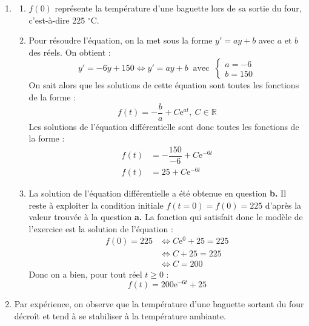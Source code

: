 \documentclass[10pt]{article}
\providecommand{\R}{\mathbb{R}}
\providecommand{\e}{{\mathrm{e}}}
\begin{document}
\begin{enumerate}
\item 
	\begin{enumerate}
		\item
$f(0)$ représente la température d'une baguette lors de sa sortie du four, c'est-à-dire 225 $^{\circ}$C.		
		\item 
Pour résoudre l'équation, on la met sous la forme $y'=ay+b$ avec $a$ et $b$ des réels. On obtient :
        \begin{equation*}
            y'=-6y+150 \iff y'=ay+b \ \text{ avec } \ \begin{cases}
            a=-6 \\ b=150
            \end{cases}
        \end{equation*}
        On sait alors que les solutions de cette équation sont toutes les fonctions de la forme : 
        \begin{equation*}
            f(t)= - \dfrac{b}{a}+C\e^{at}, \ C \in \R
        \end{equation*}
 Les solutions de l'équation différentielle sont donc toutes les fonctions de la forme : 
        \begin{align*}
            f(t) &= - \dfrac{150}{-6} + C\e^{-6t} \\
            f(t) &= 25 + C\e^{-6t}
        \end{align*}		
		
		\item
La solution de l'équation différentielle a été obtenue en question \textbf{b.} Il reste à exploiter la condition initiale $f(t=0)=f(0)= 225$ d'après la valeur trouvée à la question \textbf{a.} La fonction qui satisfait donc le modèle de l'exercice est la solution de l'équation : 
        \begin{align*}
            f(0)= 225 &\Longleftrightarrow C\e^{0} + 25 = 225 \\
            &\Longleftrightarrow C + 25 = 225 \\
            &\Longleftrightarrow C= 200
        \end{align*}
        Donc on a bien, pour tout réel $t \geqslant 0$ : 
\begin{equation*}
    f(t)= 200\e^{-6t}+25
\end{equation*}		
		
	\end{enumerate}
\item Par expérience, on observe que la température d'une baguette sortant du four décroît et tend à se stabiliser à la température ambiante.




\end{enumerate}
\end{document}
